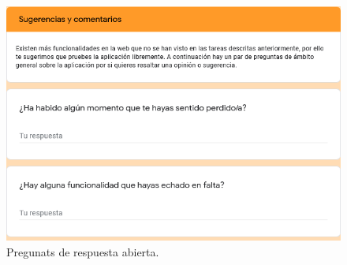 \begin{figure}[h!]
	\centering
	\includegraphics[width=\linewidth]{Imagenes/Bitmap/Preguntas-respuestalibre}
	\caption{Pregunats de respuesta abierta.}
	\label{fig:preguntas-respuestalibre}
\end{figure}


